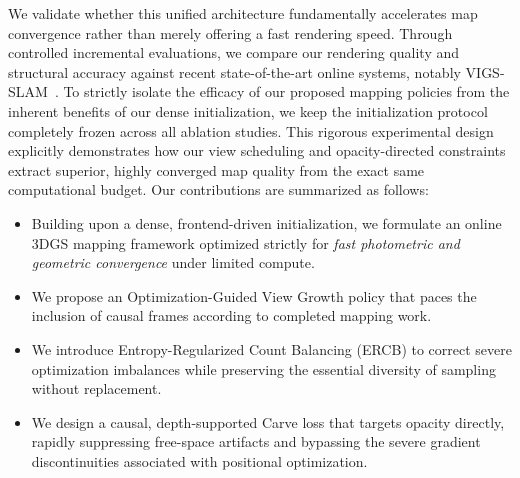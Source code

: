 We validate whether this unified architecture fundamentally accelerates map convergence rather than merely offering a fast rendering speed. Through controlled incremental evaluations, we compare our rendering quality and structural accuracy against recent state-of-the-art online systems, notably VIGS-SLAM~\cite{vigsslam}. To strictly isolate the efficacy of our proposed mapping policies from the inherent benefits of our dense initialization, we keep the initialization protocol completely frozen across all ablation studies. This rigorous experimental design explicitly demonstrates how our view scheduling and opacity-directed constraints extract superior, highly converged map quality from the exact same computational budget. Our contributions are summarized as follows:
\begin{itemize}
    \item Building upon a dense, frontend-driven initialization, we formulate an online 3DGS mapping framework optimized strictly for \emph{fast photometric and geometric convergence} under limited compute.
    \item We propose an Optimization-Guided View Growth policy that paces the inclusion of causal frames according to completed mapping work.
    \item We introduce Entropy-Regularized Count Balancing (ERCB) to correct severe optimization imbalances while preserving the essential diversity of sampling without replacement.
    \item We design a causal, depth-supported Carve loss that targets opacity directly, rapidly suppressing free-space artifacts and bypassing the severe gradient discontinuities associated with positional optimization.
\end{itemize}

